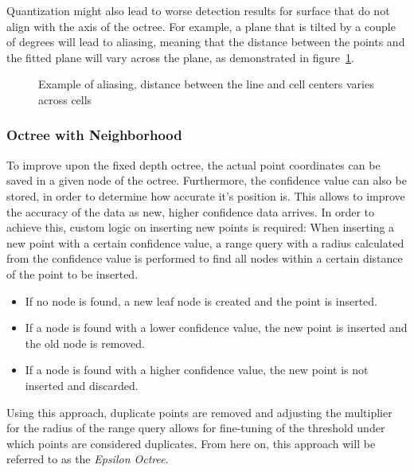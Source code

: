 Quantization might also lead to worse detection results for surface that do not align with the axis of the octree.
For example, a plane that is tilted by a couple of degrees will lead to aliasing,
meaning that the distance between the points and the fitted plane will vary across the plane, as demonstrated in figure~\ref{fig:aliasing}.
\vspace{0.1em}
\begin{figure}[h!]
    \centering
    \caption{Example of aliasing, distance between the line and cell centers varies across cells}
    \label{fig:aliasing}
\end{figure}

\subsubsection{Octree with Neighborhood}

To improve upon the fixed depth octree, the actual point coordinates can be saved in a given node of the octree.
Furthermore, the confidence value can also be stored, in order to determine how accurate it's position is.
This allows to improve the accuracy of the data as new, higher confidence data arrives.
In order to achieve this, custom logic on inserting new points is required:
When inserting a new point with a certain confidence value, a range query with a radius calculated from the confidence value
is performed to find all nodes within a certain distance of the point to be inserted.
\begin{itemize}
\item If no node is found, a new leaf node is created and the point is inserted.
\item If a node is found with a lower confidence value, the new point is inserted and the old node is removed.
\item If a node is found with a higher confidence value, the new point is not inserted and discarded.
\end{itemize}
Using this approach, duplicate points are removed and adjusting the multiplier for the radius of the range query
allows for fine-tuning of the threshold under which points are considered duplicates.
From here on, this approach will be referred to as the \textit{Epsilon Octree}.

